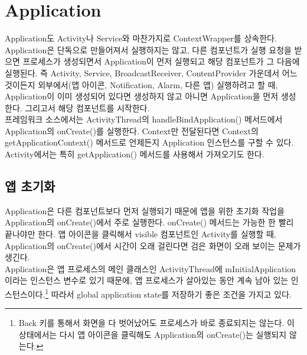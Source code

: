 \chapter{Application}
Application도 Activity나 Service와 마찬가지로 ContextWrapper를 상속한다.
Application은 단독으로 만들어져서 실행하지는 않고, 다른 컴포넌트가 실행 요청을 받으면 프로세스가 생성되면서 Application이 먼저 실행되고 해당 컴포넌트가 그 다음에 실행된다. 즉 Activity, Service, BroadcastReceiver, ContentProvider 가운데서 어느 것이든지 외부에서(앱 아이콘, Notification, Alarm, 다른 앱) 실행하려고 할 때, Application이 이미 생성되어 있다면 생성하지 않고 아니면 Application을 먼저 생성한다. 그리고서 해당 컴포넌트를 시작한다.\\

프레임워크 소스에서는 ActivityThread의 handleBindApplication() 메서드에서 Application의 onCreate()를 실행한다.
Context만 전달된다면 Context의 getApplicationContext() 메서드로 언제든지 Application 인스턴스를 구할 수 있다. Activity에서는 특히 getApplication() 메서드를 사용해서 가져오기도 한다.

\section{앱 초기화}
Application은 다른 컴포넌트보다 먼저 실행되기 때문에 앱을 위한 초기화 작업을 Application의 onCreate()에서 주로 실행한다.
onCreate() 메서드는 가능한 한 빨리 끝나야만 한다. 
앱 아이콘을 클릭해서 visible 컴포넌트인 Activity를 실행할 때, Application의 onCreate()에서 시간이 오래 걸린다면 검은 화면이 오래 보이는 문제가 생긴다.\\

Application은 앱 프로세스의 메인 클래스인 ActivityThread에 mInitialApplication이라는 인스턴스 변수로 있기 때문에, 앱 프로세스가 살아있는 동안 계속 남아 있는 인스턴스이다.\footnote{Back 키를 통해서 화면을 다 벗어났어도 프로세스가 바로 종료되지는 않는다. 이 상태에서는 다시 앱 아이콘을 클릭해도 Application의 onCreate()는 실행되지 않는다.}
따라서 global application state를 저장하기 좋은 조건을 가지고 있다.\\


